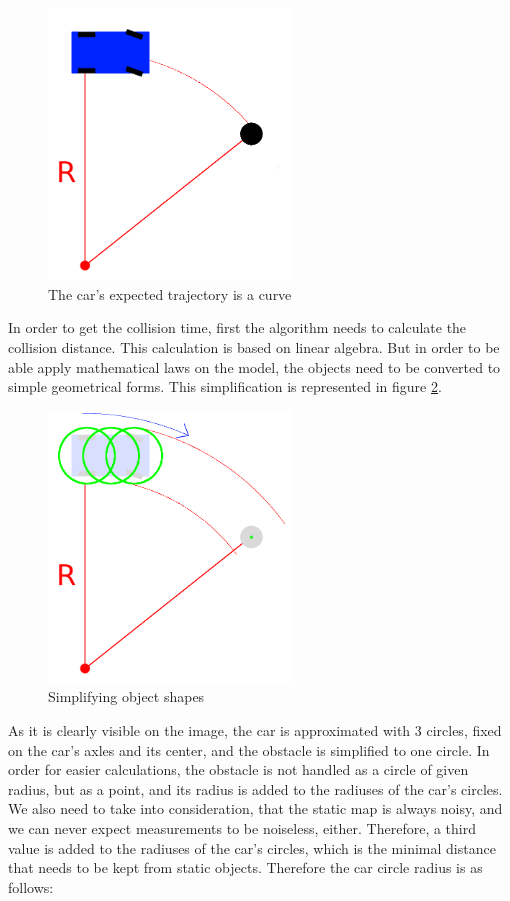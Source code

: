 \begin{figure}[!ht]
    \centering
    \includegraphics[height=72mm]{figures/raw/static_collision_time_check_objects.png}
    \caption{The car's expected trajectory is a curve}
    \label{static_collision_time_check_objects}
\end{figure}

In order to get the collision time, first the algorithm needs to calculate the collision distance. This calculation is based on linear algebra. But in order to be able apply mathematical laws on the model, the objects need to be converted to simple geometrical forms. This simplification is represented in figure \ref{static_collision_time_check_object_simplification}.

\begin{figure}[!ht]
    \centering
    \includegraphics[height=72mm]{figures/raw/static_collision_time_check_object_simplification.png}
    \caption{Simplifying object shapes}
    \label{static_collision_time_check_object_simplification}
\end{figure}

As it is clearly visible on the image, the car is approximated with 3 circles, fixed on the car's axles and its center, and the obstacle is simplified to one circle. In order for easier calculations, the obstacle is not handled as a circle of given radius, but as a point, and its radius is added to the radiuses of the car's circles. We also need to take into consideration, that the static map is always noisy, and we can never expect measurements to be noiseless, either. Therefore, a third value is added to the radiuses of the car's circles, which is the minimal distance that needs to be kept from static objects. Therefore the car circle radius is as follows:

